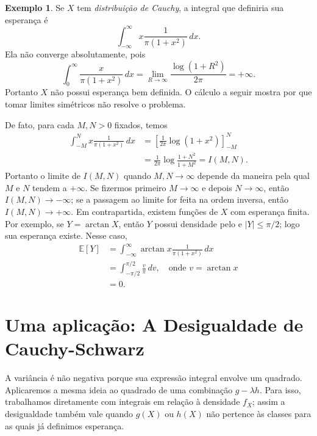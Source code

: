 \documentclass[12pt,portuguese]{article}
\theoremstyle{definition}
\newtheorem{example}[example]{Exemplo}
\theoremstyle{plainexercise}
\theoremstyle{starredexercise}
\theoremstyle{definition}
\begin{document}
\begin{example}\label{ex:esperanca-cauchy}
  Se $X$ tem \emph{distribuição de Cauchy}, a integral que definiria
  sua esperança é
  \[
    \int_{-\infty}^{\infty} x \frac{1}{\pi(1 + x^2)}\,dx.
  \]
  Ela não converge absolutamente, pois
  \[
    \int_0^\infty\frac{x}{\pi(1+x^2)}\,dx
    =\lim_{R\to\infty}\frac{\log(1+R^2)}{2\pi}=+\infty.
  \]
  Portanto $X$ não possui esperança bem definida. O cálculo a seguir
  mostra por que tomar limites simétricos não resolve o problema.
  
  \medskip 
  De fato, para cada $M, N > 0$ fixados, temos
  \[
    \begin{aligned}
      \int_{-M}^{N} x \frac{1}{\pi(1 + x^2)}\,dx &=
        \left[\frac{1}{2\pi}\log(1 + x^2)\right]_{-M}^{N} \\
      &= \frac{1}{2\pi}\log\frac{1 + N^2}{1 + M^2} = I(M, N).
    \end{aligned}
  \]
  Portanto o limite de $I(M, N)$ quando $M, N \to \infty$ depende da
  maneira pela qual $M$ e $N$ tendem a $+\infty$. Se fizermos primeiro
  $M \to \infty$ e depois $N \to \infty$, então $I(M, N) \to -\infty$;
  se a passagem ao limite for feita na ordem inversa, então
  $I(M, N) \to +\infty$. Em contrapartida, existem funções de $X$
  com esperança finita. Por exemplo, se $Y=\arctan X$, então $Y$ possui
  densidade pelo  e
  $|Y|\leqslant\pi/2$; logo sua esperança existe. Nesse caso,
  \[
    \begin{aligned}
      \mathbb{E}[Y] &= \int_{-\infty}^{\infty} \arctan x \frac{1}{\pi(1 +
        x^2)}\,dx \\
      &= \int_{-\pi/2}^{\pi/2} \frac{v}{\pi}\,dv, 
        \quad \text{onde } v = \arctan x \\
      &= 0.
    \end{aligned}
  \]
\end{example}

\section{Uma aplicação: A Desigualdade de Cauchy-Schwarz}\label{sec:cauchy-schwarz}

A variância é não negativa porque sua expressão integral envolve um
quadrado. Aplicaremos a mesma ideia ao quadrado de uma combinação
$g-\lambda h$. Para isso, trabalhamos diretamente com integrais em
relação à densidade $f_X$; assim a desigualdade também vale quando
$g(X)$ ou $h(X)$ não pertence às classes para as quais já definimos
esperança.
\end{document}

